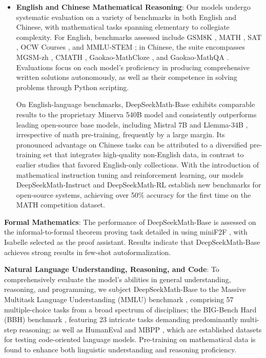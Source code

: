 \begin{itemize}[topsep=0pt]
    \item \textbf{English and Chinese Mathematical Reasoning}: Our models undergo systematic evaluation on a variety of benchmarks in both English and Chinese, with mathematical tasks spanning elementary to collegiate complexity. For English, benchmarks assessed include GSM8K \citep{gsm8k}, MATH \citep{MATH}, SAT \citep{llemma}, OCW Courses \citep{minerva}, and MMLU-STEM \citep{mmlu}; in Chinese, the suite encompasses MGSM-zh \citep{mgsm}, CMATH \citep{wei2023cmath}, Gaokao-MathCloze \citep{agieval}, and Gaokao-MathQA \citep{agieval}. Evaluations focus on each model's proficiency in producing comprehensive written solutions autonomously, as well as their competence in solving problems through Python scripting.

    On English-language benchmarks, DeepSeekMath-Base exhibits comparable results to the proprietary Minerva 540B \citep{minerva} model and consistently outperforms leading open-source base models, including Mistral 7B \citep{mistral} and Llemma-34B \citep{llemma}, irrespective of math pre-training, frequently by a large margin. Its pronounced advantage on Chinese tasks can be attributed to a diversified pre-training set that integrates high-quality non-English data, in contrast to earlier studies \citep{minerva,llemma} that favored English-only collections. With the introduction of mathematical instruction tuning and reinforcement learning, our models DeepSeekMath-Instruct and DeepSeekMath-RL establish new benchmarks for open-source systems, achieving over 50\% accuracy for the first time on the MATH competition dataset.
\end{itemize}

\item \textbf{Formal Mathematics}: The performance of DeepSeekMath-Base is assessed on the informal-to-formal theorem proving task detailed in \citep{dsp_proof} using miniF2F \citep{minif2f}, with Isabelle \citep{isabelle} selected as the proof assistant. Results indicate that DeepSeekMath-Base achieves strong results in few-shot autoformalization.

\item \textbf{Natural Language Understanding, Reasoning, and Code}: To comprehensively evaluate the model’s abilities in general understanding, reasoning, and programming, we subject DeepSeekMath-Base to the Massive Multitask Language Understanding (MMLU) benchmark \citep{mmlu}, comprising 57 multiple-choice tasks from a broad spectrum of disciplines; the BIG-Bench Hard (BBH) benchmark \citep{bbh}, featuring 23 intricate tasks demanding predominantly multi-step reasoning; as well as HumanEval \citep{codex} and MBPP \citep{mbpp}, which are established datasets for testing code-oriented language models. Pre-training on mathematical data is found to enhance both linguistic understanding and reasoning proficiency.

